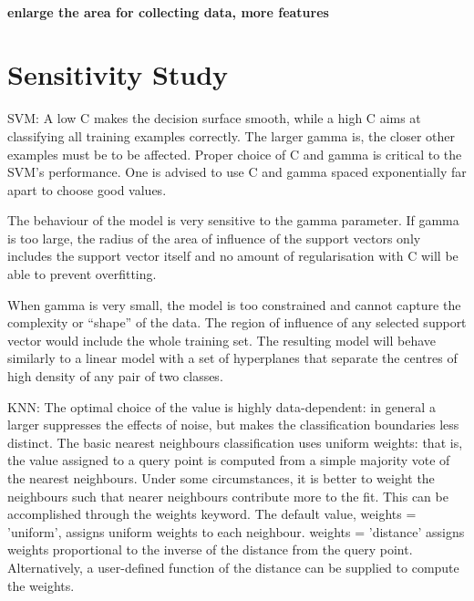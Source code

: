 \documentclass[runningheads]{llncs}
\begin{document}
\paragraph{enlarge the area for collecting data, more features}
%
%
%
%
%
%
%
%
%
%
%
%
%
%
\pagebreak
\section{Sensitivity Study}
%
%
%
SVM: 
A low C makes the decision surface smooth, while a high C aims at classifying all training examples correctly.
The larger gamma is, the closer other examples must be to be affected.
Proper choice of C and gamma is critical to the SVM’s performance. One is advised to use C and gamma spaced exponentially far apart to choose good values.

The behaviour of the model is very sensitive to the gamma parameter. If gamma is too large, the radius of the area of influence of the support vectors only includes the support vector itself and no amount of regularisation with C will be able to prevent overfitting.

When gamma is very small, the model is too constrained and cannot capture the complexity or “shape” of the data. The region of influence of any selected support vector would include the whole training set. The resulting model will behave similarly to a linear model with a set of hyperplanes that separate the centres of high density of any pair of two classes.

KNN: 
The optimal choice of the value  is highly data-dependent: in general a larger  suppresses the effects of noise, but makes the classification boundaries less distinct.
The basic nearest neighbours classification uses uniform weights: that is, the value assigned to a query point is computed from a simple majority vote of the nearest neighbours. Under some circumstances, it is better to weight the neighbours such that nearer neighbours contribute more to the fit. This can be accomplished through the weights keyword. The default value, weights = 'uniform', assigns uniform weights to each neighbour. weights = 'distance' assigns weights proportional to the inverse of the distance from the query point. Alternatively, a user-defined function of the distance can be supplied to compute the weights.
%
%
%
%
%
%
%
%
%
%
%
%
\pagebreak
\end{document}
